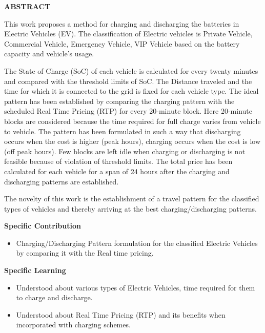 \documentclass[a4paper, 12pt, oneside]{sastra}
\begin{document}
	\begin{center}
		\Large{{\textbf{ABSTRACT}}}
	\end{center}
	
	
	\vspace*{24pt}
	
	\noindent This work proposes a method for charging and discharging the batteries in Electric Vehicles (EV). The classification of Electric vehicles is Private Vehicle, Commercial Vehicle, Emergency Vehicle, VIP Vehicle based on the battery capacity and vehicle's usage.
	
	\noindent The State of Charge (SoC) of each vehicle is calculated for every twenty minutes and compared with the threshold limits of SoC. The Distance traveled and the time for which it is connected to the grid is fixed for each vehicle type. The ideal pattern has been established by comparing the charging pattern with the scheduled Real Time Pricing (RTP) for every 20-minute block. Here 20-minute blocks are considered because the time required for full charge varies from vehicle to vehicle. The pattern has been formulated in such a way that discharging occurs when the cost is higher (peak hours), charging occurs when the cost is low (off peak hours). Few blocks are left idle when charging or discharging is not feasible because of violation of threshold limits. The total price has been calculated for each vehicle for a span of 24 hours after the charging and discharging patterns are established.
	
	\noindent The novelty of this work is the establishment of a travel pattern for the classified types of vehicles and thereby arriving at the best charging/discharging patterns.
	
	
	\noindent \textbf{Specific Contribution}
	\begin{itemize}
		\item Charging/Discharging Pattern formulation for the classified Electric Vehicles by comparing it with the Real time pricing.
	\end{itemize}
	\noindent \textbf{Specific Learning}
	\begin{itemize}
		\item Understood about various types of Electric Vehicles, time required for them to charge and discharge.
		\item Understood about Real Time Pricing (RTP) and its benefits when incorporated with charging schemes.
	\end{itemize}
	
\end{document}
